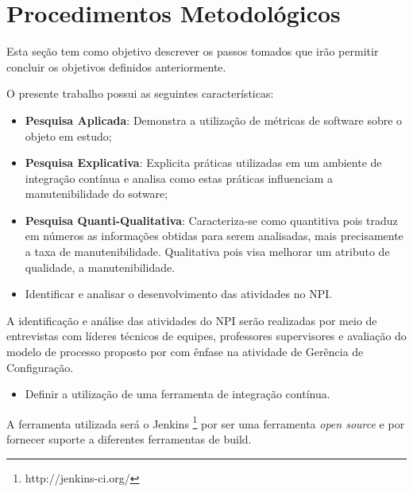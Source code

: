 \chapter{Procedimentos Metodológicos}\label{metodologia}

Esta seção tem como objetivo descrever os passos tomados que irão permitir concluir os objetivos definidos anteriormente.

O presente trabalho possui as seguintes características:

\begin{itemize}
\item \textbf{Pesquisa Aplicada}: Demonstra a utilização de métricas de software sobre o objeto em estudo;

\item \textbf{Pesquisa Explicativa}: Explicita práticas utilizadas em um ambiente de integração contínua e analisa como estas práticas influenciam a manutenibilidade do sotware;

\item \textbf{Pesquisa Quanti-Qualitativa}: Caracteriza-se como quantitiva pois traduz em números as informações obtidas para serem analisadas, mais precisamente a taxa de manutenibilidade. Qualitativa pois visa melhorar um atributo de qualidade, a manutenibilidade.
\end{itemize}


\begin{itemize}
\item Identificar e analisar o desenvolvimento das atividades no NPI.
\end{itemize}
A identificação e análise das atividades do NPI serão realizadas por meio de entrevistas com líderes técnicos de equipes, professores supervisores e avaliação do modelo de processo proposto por  com ênfase na atividade de Gerência de Configuração.

\begin{itemize}
\item Definir a utilização de uma ferramenta de integração contínua.
\end{itemize}
A ferramenta utilizada será o Jenkins \footnote{http://jenkins-ci.org/} por ser uma ferramenta \textit{open source} e por fornecer suporte a diferentes ferramentas de build.

